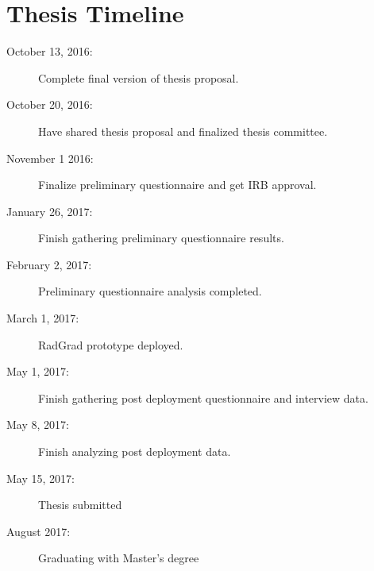\chapter{Thesis Timeline}
\begin{description}
\item[October 13, 2016:] Complete final version of thesis proposal. 
\item[October 20, 2016:] Have shared thesis proposal and finalized thesis committee.
\item[November 1 2016:] Finalize preliminary questionnaire and get IRB approval.
\item[January 26, 2017:] Finish gathering preliminary questionnaire results.
\item[February 2, 2017:] Preliminary questionnaire analysis completed.
\item[March 1, 2017:] RadGrad prototype deployed.
\item[May 1, 2017:] Finish gathering post deployment questionnaire and interview data.
\item[May 8, 2017:] Finish analyzing post deployment data.
\item[May 15, 2017:] Thesis submitted
\item[August 2017:] Graduating with Master's degree
\end{description}